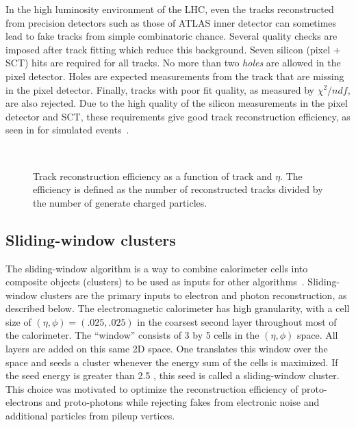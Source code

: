 In the high luminosity environment of the LHC, even the tracks reconstructed from precision detectors such as those of ATLAS inner detector can sometimes lead to fake tracks from simple combinatoric chance.
Several quality checks are imposed after track fitting which reduce this background.
Seven silicon (pixel + SCT) hits are required for all tracks.
No more than two \textit{holes} are allowed in the pixel detector.
Holes are expected measurements from the track that are missing in the pixel detector.
Finally, tracks with poor fit quality, as measured by $\chi^2/ndf$, are also rejected.
Due to the high quality of the silicon measurements in the pixel detector and SCT, these requirements give good track reconstruction efficiency, as seen in  for simulated events~\cite{Hamano:1489674}.
\begin{figure}
\caption{Track reconstruction efficiency as a function of track \pt and $\eta$.
The efficiency is defined as the number of reconstructed tracks divided by the number of generate charged particles.} \label{fig:track_eff}
 \\
\end{figure}

\subsection{Sliding-window clusters}\label{sec:sliding_window_cluster}

The sliding-window algorithm is a way to combine calorimeter cells into composite objects (clusters) to be used as inputs for other algorithms~\cite{PERF-2013-03}.
Sliding-window clusters are the primary inputs to electron and photon reconstruction, as described below.
The electromagnetic calorimeter has high granularity, with a cell size of $(\eta, \phi) = (.025, .025)$ in the coarsest second layer throughout most of the calorimeter.
The ``window'' consists of 3 by 5 cells in the $(\eta, \phi)$ space.
All layers are added on this same 2D space.
One translates this window over the space and seeds a cluster whenever the energy sum of the cells is maximized.
If the seed energy is greater than 2.5 \GeV, this seed is called a sliding-window cluster.
This choice was motivated to optimize the reconstruction efficiency of proto-electrons and proto-photons while rejecting fakes from electronic noise and additional particles from pileup vertices.


